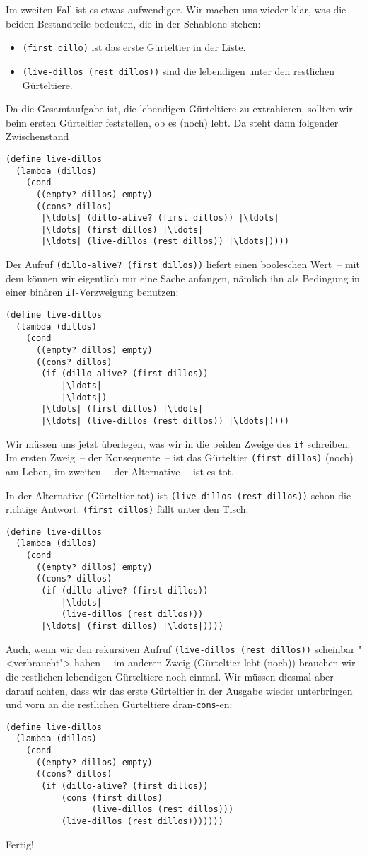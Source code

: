 Im zweiten Fall ist es etwas aufwendiger.  Wir machen uns wieder klar,
was die beiden Bestandteile bedeuten, die in der Schablone stehen:
%
\begin{itemize}
\item \lstinline{(first dillo)} ist das erste Gürteltier in der Liste.
\item \lstinline{(live-dillos (rest dillos))} sind die lebendigen
  unter den restlichen Gürteltiere.
\end{itemize}
%
Da die Gesamtaufgabe ist, die lebendigen Gürteltiere
zu extrahieren, sollten wir beim ersten Gürteltier feststellen, ob
es (noch) lebt.  Da steht dann folgender Zwischenstand
%
\begin{lstlisting}
(define live-dillos
  (lambda (dillos)
    (cond
      ((empty? dillos) empty)
      ((cons? dillos)
       |\ldots| (dillo-alive? (first dillos)) |\ldots|
       |\ldots| (first dillos) |\ldots|
       |\ldots| (live-dillos (rest dillos)) |\ldots|))))
\end{lstlisting}
%
Der Aufruf \lstinline{(dillo-alive? (first dillos))} liefert einen
booleschen Wert~-- mit dem können wir eigentlich nur eine Sache
anfangen, nämlich ihn als Bedingung in einer binären
\lstinline{if}-Verzweigung benutzen:
%
\begin{lstlisting}
(define live-dillos
  (lambda (dillos)
    (cond
      ((empty? dillos) empty)
      ((cons? dillos)
       (if (dillo-alive? (first dillos))
           |\ldots|
           |\ldots|)
       |\ldots| (first dillos) |\ldots|
       |\ldots| (live-dillos (rest dillos)) |\ldots|))))
\end{lstlisting}
%
Wir müssen uns jetzt überlegen, was wir in die beiden Zweige des
\lstinline{if} schreiben.  Im ersten Zweig~-- der Konsequente~--  ist
das Gürteltier \lstinline{(first dillos)} (noch) am Leben, im
zweiten~-- der Alternative~-- ist es tot.

In der Alternative (Gürteltier tot) ist \lstinline{(live-dillos (rest dillos))} schon
die richtige Antwort.  \lstinline{(first dillos)} fällt unter den Tisch:
%
\begin{lstlisting}
(define live-dillos
  (lambda (dillos)
    (cond
      ((empty? dillos) empty)
      ((cons? dillos)
       (if (dillo-alive? (first dillos))
           |\ldots|
           (live-dillos (rest dillos)))
       |\ldots| (first dillos) |\ldots|))))
\end{lstlisting}
%
Auch, wenn wir den rekursiven Aufruf \lstinline{(live-dillos (rest dillos))}
scheinbar "<verbraucht"> haben~-- im  anderen Zweig (Gürteltier lebt
(noch)) brauchen wir die restlichen lebendigen Gürteltiere noch
einmal.  Wir müssen diesmal aber darauf achten, dass wir das erste
Gürteltier in der Ausgabe wieder unterbringen und vorn an die
restlichen Gürteltiere dran-\lstinline{cons}-en:\label{page:live-dillos}
%
\begin{lstlisting}
(define live-dillos
  (lambda (dillos)
    (cond
      ((empty? dillos) empty)
      ((cons? dillos)
       (if (dillo-alive? (first dillos))
           (cons (first dillos)
                 (live-dillos (rest dillos)))
           (live-dillos (rest dillos)))))))
\end{lstlisting}
%
Fertig!

